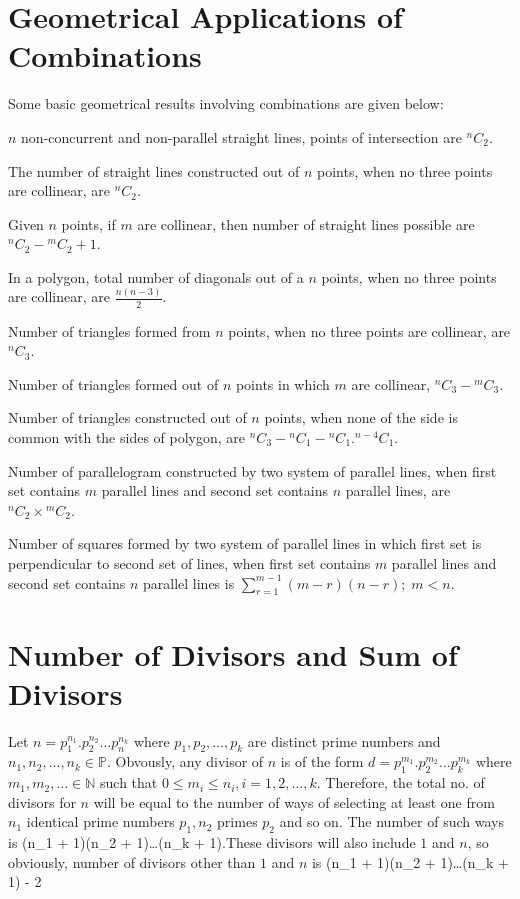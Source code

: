 \section{Geometrical Applications of Combinations}
Some basic geometrical results involving combinations are given below:
\startitemize[n]
\item $n$ non-concurrent and non-parallel straight lines, points of intersection are ${}^nC_2$.
\item The number of straight lines constructed out of $n$ points, when no three points are collinear, are ${}^nC_2$.
\item Given $n$ points, if $m$ are collinear, then number of straight lines possible are ${}^nC_2 - {}^mC_2 + 1$.
\item In a polygon, total number of diagonals out of a $n$ points, when no three points are collinear, are $\frac{n(n - 3)}{2}$.
\item Number of triangles formed from $n$ points, when no three points are collinear, are ${}^nC_3$.
\item Number of triangles formed out of $n$ points in which $m$ are collinear, ${}^nC_3 - {}^mC_3$.
\item Number of triangles constructed out of $n$ points, when none of the side is common with the sides of polygon, are ${}^nC_3 -
  {}^nC_1 - {}^nC_1.{}^{n - 4}C_1$.
\item Number of parallelogram constructed by two system of parallel lines, when first set contains $m$ parallel lines and second
  set contains $n$ parallel lines, are ${}^nC_2\times{}^mC_2$.
\item Number of squares formed by two system of parallel lines in which first set is perpendicular to second set of lines, when
  first set contains $m$ parallel lines and second set contains $n$ parallel lines is $\displaystyle\sum_{r=1}^{m - 1}(m - r)(n -
  r);\;m<n$.
\stopitemize

\section{Number of Divisors and Sum of Divisors}
Let $n = p_1^{n_1}.p_2^{n_2}\ldots p_n^{n_k}$ where $p_1, p_2, \ldots, p_k$ are distinct prime numbers and $n_1, n_2, \ldots,
n_k\in \mathbb{P}$. Obvously, any divisor of $n$ is of the form $d = p_1^{m_1}.p_2^{m_2}\ldots p_k^{m_k}$ where $m_1, m_2,
\ldots\in\mathbb{N}$ such that $0\leq m_i\leq n_i, i = 1, 2, \ldots, k$. Therefore, the total no. of divisors for $n$ will be equal
to the number of ways of selecting at least one from $n_1$ identical prime numbers $p_1, n_2$ primes $p_2$ and so on. The number of
such ways is \startformula (n_1 + 1)(n_2 + 1)\ldots(n_k + 1).\stopformula These divisors will also include $1$ and $n$, so obviously, number of divisors
other than $1$ and $n$ is \startformula (n_1 + 1)(n_2 + 1)\ldots(n_k + 1) - 2\stopformula

